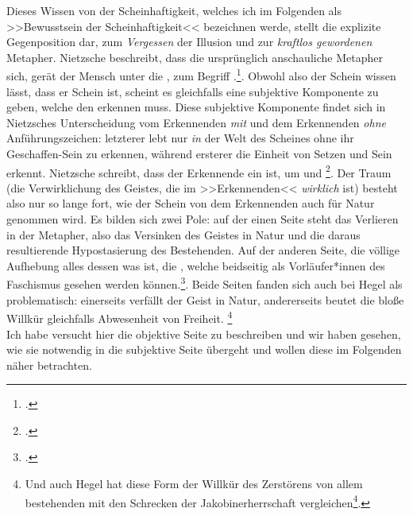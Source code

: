 \documentclass[12pt, a4paper, openany]{report}
\begin{document}
Dieses Wissen von der Scheinhaftigkeit, welches ich im Folgenden als >>Bewusstsein der Scheinhaftigkeit<< bezeichnen werde, stellt die explizite Gegenposition dar, zum \emph{Vergessen} der Illusion und zur \emph{kraftlos gewordenen} Metapher.
Nietzsche beschreibt, dass die ursprünglich anschauliche Metapher sich, gerät der Mensch unter die , zum Begriff .\footcite[][881]{nietzsche_geburt_1999}.
Obwohl also der Schein wissen lässt, dass er Schein ist, scheint es gleichfalls eine subjektive Komponente zu geben, welche den  erkennen muss.
Diese subjektive Komponente findet sich in Nietzsches Unterscheidung vom Erkennenden \emph{mit} und dem Erkennenden \emph{ohne} Anführungszeichen:
letzterer lebt nur \emph{in} der Welt des Scheines ohne ihr Geschaffen-Sein zu erkennen, während ersterer die Einheit von Setzen und Sein erkennt. 
Nietzsche schreibt, dass der Erkennende ein  ist, um  und \footcite[][417]{nietzsche_morgenrote_1999}.
Der Traum (die Verwirklichung des Geistes, die im >>Erkennenden<< \emph{wirklich} ist) besteht also nur so lange fort, wie der Schein von dem Erkennenden auch für Natur genommen wird. 
Es bilden sich zwei Pole:
auf der einen Seite steht das Verlieren in der Metapher, also das Versinken des Geistes in Natur und die daraus resultierende Hypostasierung des Bestehenden.
Auf der anderen Seite, die völlige Aufhebung alles dessen was ist, die , welche beidseitig als Vorläufer*innen des Faschismus gesehen werden können.\footcite[Vergleiche dazu beispielsweise:][S. 61, S. 69]{stephan_nietzscheanismus_2019}.
Beide Seiten fanden sich auch bei Hegel als problematisch:
einerseits verfällt der Geist in Natur, andererseits beutet die bloße Willkür gleichfalls Abwesenheit von Freiheit.%
\footnote{
    Und auch Hegel hat diese Form der Willkür des Zerstörens von allem bestehenden mit den Schrecken der Jakobinerherrschaft vergleichen\footcite[Vgl.][39]{hegel_grundlinien_2017}.
}\\

Ich habe versucht hier die objektive Seite zu beschreiben und wir haben gesehen, wie sie notwendig in die subjektive Seite übergeht und wollen diese im Folgenden näher betrachten.
\end{document}
